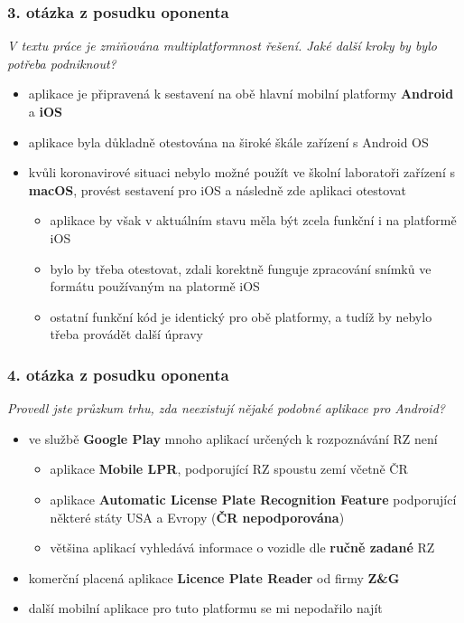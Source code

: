 \documentclass{beamer}
\begin{document}
\begin{frame}
\frametitle{3. otázka z posudku oponenta}
    \begingroup
    \fontsize{11pt}{12pt}\selectfont
    \textit{V textu práce je zmiňována multiplatformnost řešení. Jaké další kroky by bylo potřeba podniknout?}
    \endgroup
    \bigskip
    \begin{itemize}
        \item aplikace je připravená k sestavení na obě hlavní mobilní platformy \textbf{Android} a \textbf{iOS}
        \item aplikace byla důkladně otestována na široké škále zařízení s Android OS
        \item kvůli koronavirové situaci nebylo možné použít ve školní laboratoři zařízení s \textbf{macOS}, provést sestavení pro iOS a následně zde aplikaci otestovat 
        \begin{itemize}
            \item aplikace by však v aktuálním stavu měla být zcela funkční i na platformě iOS
            \item bylo by třeba otestovat, zdali korektně funguje zpracování snímků ve formátu používaným na platormě iOS 
            \item ostatní funkční kód je identický pro obě platformy, a tudíž by nebylo třeba provádět další úpravy 
        \end{itemize}
    \end{itemize}
\end{frame}

\begin{frame}
\frametitle{4. otázka z posudku oponenta}
    \begingroup
    \fontsize{11pt}{12pt}\selectfont
    \textit{Provedl jste průzkum trhu, zda neexistují nějaké podobné aplikace pro Android?}
    \endgroup
    \bigskip
    \begin{itemize}
        \item ve službě \textbf{Google Play} mnoho aplikací určených k rozpoznávání RZ není
            \begin{itemize}
                \item aplikace \textbf{Mobile LPR}, podporující RZ spoustu zemí včetně ČR
                \item aplikace \textbf{Automatic License Plate Recognition Feature} podporující některé státy USA a Evropy (\textbf{ČR nepodporována})
                \item většina aplikací vyhledává informace o vozidle dle \textbf{ručně zadané} RZ
            \end{itemize}
        \item komerční placená aplikace \textbf{Licence Plate Reader} od firmy \textbf{Z&G}

        \item další mobilní aplikace pro tuto platformu se mi nepodařilo najít
    \end{itemize}
\end{frame}
\end{document}
